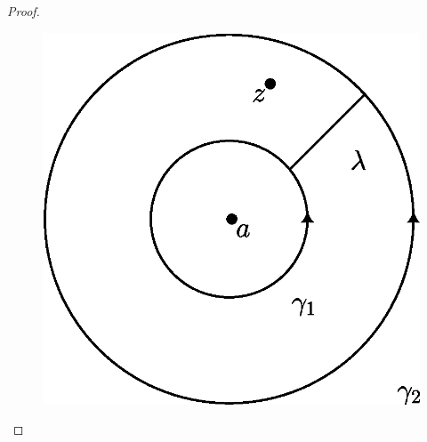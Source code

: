 \begin{proof}
    \begin{figure}[h]
        \centering
        \includegraphics[scale=0.5]{Figures/Chapter5/laurent_series.eps}
        \caption{}
        \label{figure_5.2}
    \end{figure}


\end{proof}
